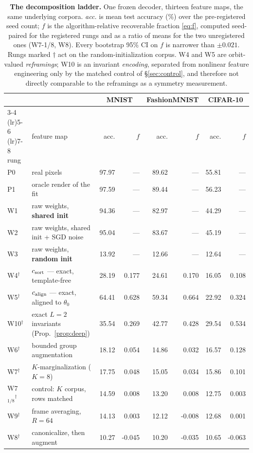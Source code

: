 \begin{table}[t]
\centering\small
\caption{\textbf{The decomposition ladder.} One frozen decoder, thirteen feature maps, the same underlying corpora. \emph{acc.} is mean test accuracy (\%) over the pre-registered seed count; $f$ is the algorithm-relative recoverable fraction \eqref{eq:f}, computed seed-paired for the registered rungs and as a ratio of means for the two unregistered ones (W7-1/8, W8). Every bootstrap 95\% CI on $f$ is narrower than $\pm0.021$. Rungs marked $\dagger$ act on the random-initialization corpus. W4 and W5 are orbit-valued \emph{reframings}; W10 is an invariant \emph{encoding}, separated from nonlinear feature engineering only by the matched control of \S\ref{sec:control}, and therefore not directly comparable to the reframings as a symmetry measurement.}
\label{tab:ladder}
\begin{tabular}{@{}llr@{\hspace{5pt}}rr@{\hspace{5pt}}rr@{\hspace{5pt}}r@{}}
\toprule
& & \multicolumn{2}{c}{MNIST} & \multicolumn{2}{c}{FashionMNIST} & \multicolumn{2}{c}{CIFAR-10} \\
\cmidrule(lr){3-4} \cmidrule(lr){5-6} \cmidrule(lr){7-8}
rung & feature map & acc. & $f$ & acc. & $f$ & acc. & $f$ \\
\midrule
P0 & real pixels & 97.97 & --- & 89.62 & --- & 55.81 & --- \\
P1 & oracle render of the fit & 97.59 & --- & 89.44 & --- & 56.23 & --- \\
\midrule
W1 & raw weights, \textbf{shared init} & 94.36 & --- & 82.97 & --- & 44.29 & --- \\
W2 & raw weights, shared init + SGD noise & 95.04 & --- & 83.67 & --- & 45.19 & --- \\
W3 & raw weights, \textbf{random init} & 13.92 & --- & 12.66 & --- & 12.64 & --- \\
\midrule
W4$^\dagger$ & $c_{\mathrm{sort}}$ --- exact, template-free & 28.19 & 0.177 & 24.61 & 0.170 & 16.05 & 0.108 \\
W5$^\dagger$ & $c_{\mathrm{align}}$ --- exact, aligned to $\theta_0$ & 64.41 & 0.628 & 59.34 & 0.664 & 22.92 & 0.324 \\
W10$^\dagger$ & exact $L{=}2$ invariants (Prop.~\ref{prop:deep}) & 35.54 & 0.269 & 42.77 & 0.428 & 29.54 & 0.534 \\
\midrule
W6$^\dagger$ & bounded group augmentation & 18.12 & 0.054 & 14.86 & 0.032 & 16.57 & 0.128 \\
W7$^\dagger$ & $K$-marginalization ($K{=}8$) & 17.75 & 0.048 & 15.05 & 0.034 & 15.86 & 0.101 \\
W7$_{1/8}$$^\dagger$ & \quad control: $K$ corpus, rows matched & 14.59 & 0.008 & 13.20 & 0.008 & 12.75 & 0.003 \\
W9$^\dagger$ & frame averaging, $R{=}64$ & 14.13 & 0.003 & 12.12 & -0.008 & 12.68 & 0.001 \\
W8$^\dagger$ & canonicalize, then augment & 10.27 & -0.045 & 10.20 & -0.035 & 10.65 & -0.063 \\
\bottomrule
\end{tabular}
\end{table}
